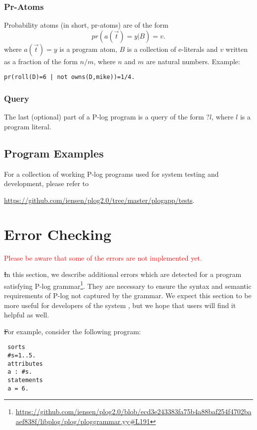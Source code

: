 \documentclass[12pt, letterpaper]{article}
\begin{document}
 \subsubsection{Pr-Atoms}

 Probability atoms (in short, pr-atoms) are of the form 
 $$pr(a(\vec{t}) = y | B) = v.$$
 where $a(\vec{t}) = y$ is a program atom, $B$ is a collection of e-literals and $v$  written as a fraction of the form $n/m$, where $n$ and $m$ are natural numbers.  Example:
\begin{center}
 \texttt{pr(roll(D)=6 | not owns(D,mike))=1/4.}
\end{center}

\subsubsection{Query}

The last (optional) part of a P-log program is a query of the form $?l$, where $l$ is a program literal. 
 \subsection{Program Examples}

 For a collection of working P-log programs used for system testing and development, please refer to
 \begin{center}
\url{https://github.com/iensen/plog2.0/tree/master/plogapp/tests}.
 \end{center}
 

 \section{Error Checking}

 \textcolor{red}{Please be aware that some of the errors are not implemented yet.}

 \st
 In this section, we describe  additional errors which are detected for a program satisfying P-log grammar\footnote{\url{https://github.com/iensen/plog2.0/blob/ecd3e243383fa75b4a88baf254f4702baaef838f/libplog/plog/ploggrammar.yy\#L191}}. They are necessary to ensure the syntax and semantic requirements of P-log not captured by the grammar.
 We expect this section to be more useful for developers of the system , but we hope that users will find it helpful as well.

 \st
 For example, consider the following program:

\begin{verbatim}
 sorts
 #s=1..5.
 attributes
 a : #s.
 statements
 a = 6. 
\end{verbatim}
\end{document}
